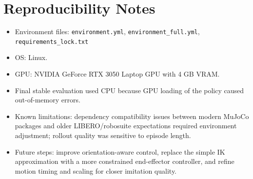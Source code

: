 \documentclass[11pt,a4paper]{article}
\begin{document}
\section{Reproducibility Notes}
\begin{itemize}[leftmargin=1.5em]
	\item Environment files: \texttt{environment.yml}, \texttt{environment\_full.yml}, \texttt{requirements\_lock.txt}
	\item OS: Linux.
	\item GPU: NVIDIA GeForce RTX 3050 Laptop GPU with 4 GB VRAM.
	\item Final stable evaluation used CPU because GPU loading of the policy caused out-of-memory errors.
	\item Known limitations: dependency compatibility issues between modern MuJoCo packages and older LIBERO/robosuite expectations required environment adjustment; rollout quality was sensitive to episode length.
	\item Future steps: improve orientation-aware control, replace the simple IK approximation with a more constrained end-effector controller, and refine motion timing and scaling for closer imitation quality.
\end{itemize}



\end{document}
